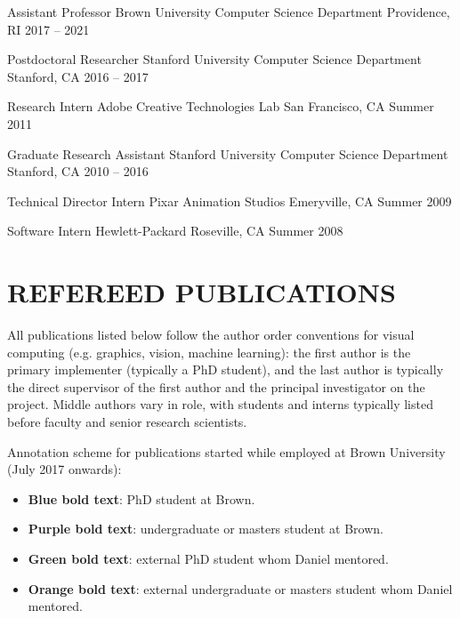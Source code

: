 \documentclass[line,margin]{res}
\begin{document}
\begin{resume}
\job
{Assistant Professor}
{Brown University Computer Science Department}
{Providence, RI}
{2017 -- 2021}

\job
{Postdoctoral Researcher}
{Stanford University Computer Science Department}
{Stanford, CA}
{2016 -- 2017}

\job
{Research Intern}
{Adobe Creative Technologies Lab}
{San Francisco, CA}
{Summer 2011}

\job
{Graduate Research Assistant}
{Stanford University Computer Science Department}
{Stanford, CA}
{2010 -- 2016}

\job
{Technical Director Intern}
{Pixar Animation Studios}
{Emeryville, CA}
{Summer 2009}

\job
{Software Intern}
{Hewlett-Packard}
{Roseville, CA}
{Summer 2008}


\section{REFEREED PUBLICATIONS}

\newcommand{\pubtitle}[1]{\textbf{#1}}
\newcommand{\pubauthors}[1]{#1}
\newcommand{\pubvenue}[1]{\emph{#1}}
\newcommand{\pubaward}[1]{\textsc{#1}}

All publications listed below follow the author order conventions for visual computing (e.g. graphics, vision, machine learning): the first author is the primary implementer (typically a PhD student), and the last author is typically the direct supervisor of the first author and the principal investigator on the project.
Middle authors vary in role, with students and interns typically listed before faculty and senior research scientists.

\newcommand{\myphd}[1]{\textbf{\color{tblue}#1}}
\newcommand{\mystud}[1]{\textbf{\color{tpurple}#1}}
\newcommand{\extphd}[1]{\textbf{\color{tgreen}#1}}
\newcommand{\extstud}[1]{\textbf{\color{torange}#1}}

Annotation scheme for publications started while employed at Brown University (July 2017 onwards):
\begin{itemize}
	\item \myphd{Blue bold text}: PhD student at Brown.
	\item \mystud{Purple bold text}: undergraduate or masters student at Brown.
	\item \extphd{Green bold text}: external PhD student whom Daniel mentored.
	\item \extstud{Orange bold text}: external undergraduate or masters student whom Daniel mentored.
\end{itemize}


\end{resume}
\end{document}
